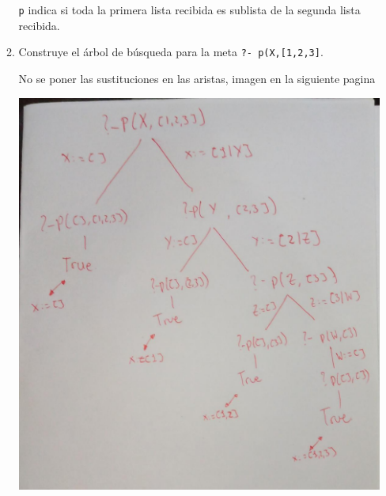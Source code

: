 \documentclass[11pt,letterpaper]{article}
\begin{document}
\begin{enumerate}
\begin{enumerate}
    \hfill\break
    {\tt p} indica si toda la primera lista recibida es sublista de la segunda
    lista recibida. 
  \item Construye el árbol de búsqueda para la meta {\tt ?- p(X,[1,2,3]}.

    \hfill\break
    
    No se poner las sustituciones en las aristas, imagen en la siguiente pagina
    \begin{center}
      \includegraphics[scale=0.4]{9}
    \end{center}
  \end{enumerate}
\end{enumerate}
\end{document}
